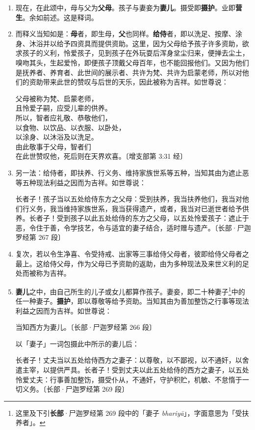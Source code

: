 \begin{enumerate}\item 现在，在此颂中，母与父为\textbf{父母}。孩子与妻妾为\textbf{妻儿}。摄受即\textbf{摄护}。业即\textbf{营生}。余如前述。这是释词。
\item 而释义当知如是：\textbf{母}者，即生母，\textbf{父}也同样。\textbf{给侍}者，即以洗足、按摩、涂身、沐浴并以给予四资具而提供资助。这里，因为父母给予孩子许多资助，欲求孩子的义利，怜爱孩子，见到孩子在外玩耍后浑身坌尘归来，便掸去尘土，嗅吻其头，生起爱怜，即便孩子顶戴父母百年，也不能回报他们。又因为他们是抚养者、养育者、此世间的展示者、共许为梵、共许为启蒙老师，所以对他们的资助带来此世的赞叹与后世的天乐，因此被称为吉祥。如世尊说：\begin{quoting}父母被称为梵、启蒙老师，\\且怜爱子嗣，应受儿辈的供养。\\所以，智者应礼敬、恭敬他们，\\以食物、以饮品、以衣服、以卧处，\\以涂身、以沐浴及以洗足。\\由此敬事于父母，智者们\\在此世赞叹他，死后则在天界欢喜。{\bluefootnotesize 〔增支部第 3:31 经〕}\end{quoting}
\item 另一法：给侍者，即扶养、行义务、维持家族世系等五种，当知其由为遮止恶等五种现法利益之因而为吉祥。如世尊说：\begin{quoting}长者子！孩子当以五处给侍东方之父母：受到扶养，我当扶养他们，我当对他们行义务，我当维持家族世系，我当获得遗产，或者，我当对已逝世者给予供养。长者子！受到孩子以此五处给侍的东方之父母，以五处怜爱孩子：遮止于恶，令住于善，令学技艺，令与适宜的妻子结合，适时赠与遗产。{\bluefootnotesize 〔长部·尸迦罗经第 267 段〕}\end{quoting}
\item 复次，若以令生净喜、令受持戒、出家等三事给侍父母者，彼即给侍父母者之最上。这给侍父母，作为父母已予资助的返助，由为多种现法及来世义利的足处而被称为吉祥。
\item \textbf{妻儿}之中，由自己所生的儿子或女儿都算作孩子。妻妾，即二十种妻子\footnote{这里及下引\textbf{长部}·尸迦罗经第 269 段中的「妻子 \textit{bhariyā}」，字面意思为「受扶养者」。}中的任一种妻子。\textbf{摄护}，即以尊敬等给予资助。当知其由为善加整饬之行事等现法利益之因而为吉祥。如世尊说：\begin{quoting}当知西方为妻儿。{\bluefootnotesize 〔长部·尸迦罗经第 266 段〕}\end{quoting}以「妻子」一词包摄此中所示的妻儿后：\begin{quoting}长者子！丈夫当以五处给侍西方之妻子：以尊敬，以不鄙视，以不通奸，以舍遣主宰，以提供严具。长者子！受到丈夫以此五处给侍的西方之妻子，以五处怜爱丈夫：行事善加整饬，摄受仆从，不通奸，守护积贮，机敏、不怠惰于一切义务。{\bluefootnotesize 〔长部·尸迦罗经第 269 段〕}\end{quoting}

\end{enumerate}
